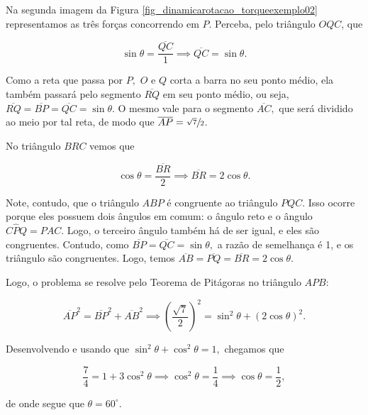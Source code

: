 \begin{exemplo}[Nível II]
Na segunda imagem da Figura \ref{fig_dinamicarotacao_torqueexemplo02} representamos as três forças concorrendo em $P.$ Perceba, pelo triângulo $OQC$, que 

$$\sin\theta = \dfrac{\overline{QC}}{1} \implies \overline{QC} = \sin \theta.$$ 

Como a reta que passa por $P,$ $O$ e $Q$ corta a barra no seu ponto médio, ela também passará pelo segmento $\overline{RQ}$ em seu ponto médio, ou seja, $\overline{RQ}=\overline{BP} =\overline{QC} = \sin \theta.$ O mesmo vale para o segmento $\overline{AC},$ que será dividido ao meio por tal reta, de modo que $\overline{AP} = \sfrac{\sqrt 7}{2}$.

No triângulo $BRC$ vemos que 

$$ \cos \theta = \dfrac{\overline{BR}}{2} \implies \overline{BR} = 2 \cos \theta.$$

Note, contudo, que o triângulo $ABP$ é congruente ao triângulo $PQC$. Isso ocorre porque eles possuem dois ângulos em comum: o ângulo reto e o ângulo $C\hat PQ = P \hat A C.$ Logo, o terceiro ângulo também há de ser igual, e eles são congruentes. Contudo, como $\overline{BP}=\overline{QC} = \sin \theta,$ a razão de semelhança é 1, e os triângulo são congruentes. Logo, temos $\overline{AB} = \overline{PQ}=\overline{BR}= 2\cos \theta.$

Logo, o problema se resolve pelo Teorema de Pitágoras no triângulo $APB:$

$$ \overline{AP}^2 = \overline{BP}^2 + \overline{AB}^2 \implies \left( \dfrac{\sqrt 7}{2}\right)^2 = \sin^2\theta + (2 \cos \theta)^2.$$

Desenvolvendo e usando que $\sin^2 \theta + \cos^2 \theta =1,$ chegamos que 

$$ \dfrac{7}{4} = 1 + 3 \cos^2 \theta \implies \cos^2 \theta = \dfrac{1}{4} \implies \cos \theta = \dfrac{1}{2},$$

\noindent de onde segue que $\boxed{\theta = 60^\circ.}$


\end{exemplo}

\vspace{0.3cm}


